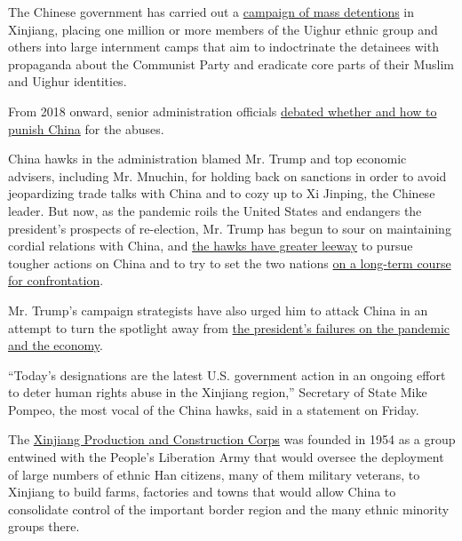The Chinese government has carried out a
\href{https://www.nytimes3xbfgragh.onion/interactive/2019/11/16/world/asia/china-xinjiang-documents.html}{campaign
of mass detentions} in Xinjiang, placing one million or more members of
the Uighur ethnic group and others into large internment camps that aim
to indoctrinate the detainees with propaganda about the Communist Party
and eradicate core parts of their Muslim and Uighur identities.

From 2018 onward, senior administration officials
\href{https://www.nytimes3xbfgragh.onion/2018/09/10/world/asia/us-china-sanctions-muslim-camps.html}{debated
whether and how to punish China} for the abuses.

China hawks in the administration blamed Mr. Trump and top economic
advisers, including Mr. Mnuchin, for holding back on sanctions in order
to avoid jeopardizing trade talks with China and to cozy up to Xi
Jinping, the Chinese leader. But now, as the pandemic roils the United
States and endangers the president's prospects of re-election, Mr. Trump
has begun to sour on maintaining cordial relations with China, and
\href{https://www.nytimes3xbfgragh.onion/2020/07/25/world/asia/us-china-trump-xi.html}{the
hawks have greater leeway} to pursue tougher actions on China and to try
to set the two nations
\href{https://www.nytimes3xbfgragh.onion/2020/07/29/podcasts/the-daily/china-trump-foreign-policy.html}{on
a long-term course for confrontation}.

Mr. Trump's campaign strategists have also urged him to attack China in
an attempt to turn the spotlight away from
\href{https://www.nytimes3xbfgragh.onion/2020/07/18/us/politics/trump-coronavirus-response-failure-leadership.html}{the
president's failures on the pandemic and the economy}.

``Today's designations are the latest U.S. government action in an
ongoing effort to deter human rights abuse in the Xinjiang region,''
Secretary of State Mike Pompeo, the most vocal of the China hawks, said
in a statement on Friday.

The
\href{https://www.nytimes3xbfgragh.onion/2009/08/07/world/asia/07xinjiang.html}{Xinjiang
Production and Construction Corps} was founded in 1954 as a group
entwined with the People's Liberation Army that would oversee the
deployment of large numbers of ethnic Han citizens, many of them
military veterans, to Xinjiang to build farms, factories and towns that
would allow China to consolidate control of the important border region
and the many ethnic minority groups there.

